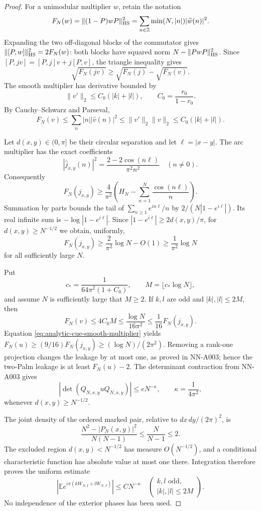 \begin{proof}
For a unimodular multiplier $w$, retain the notation
\[
 F_N(w)=\|(1-P)wP\|_{\rm HS}^2
       =\sum_{n\in\mathbb Z}\min(N,|n|)|\widehat w(n)|^2.
\]
Expanding the two off-diagonal blocks of the commutator gives
$\|[P,w]\|_{\rm HS}^2=2F_N(w)$: both blocks have squared norm
$N-\|PwP\|_{\rm HS}^2$. Since
$[P,jv]=[P,j]v+j[P,v]$, the triangle inequality gives
\begin{equation}\label{eq:analytic-cue-smooth-multiplier}
       \sqrt{F_N(jv)}\ge\sqrt{F_N(j)}-\sqrt{F_N(v)}.
\end{equation}
The smooth multiplier has derivative bounded by
\[
 \|v'\|_2\le C_0(|k|+|l|),\qquad C_0=\frac{r_0}{1-r_0}.
\]
By Cauchy--Schwarz and Parseval,
\begin{equation}\label{eq:analytic-cue-smooth-leakage}
 F_N(v)\le\sum_n|n||\widehat v(n)|^2
     \le\|v'\|_2\|v\|_2
     \le C_0(|k|+|l|).
\end{equation}

Let $d(x,y)\in(0,\pi]$ be their circular separation and let
$\ell=|x-y|$. The arc multiplier has the exact coefficients
\[
 |\widehat j_{x,y}(n)|^2
       =\frac{2-2\cos(n\ell)}{\pi^2n^2}\quad(n\ne0).
\]
Consequently
\[
 F_N(j_{x,y})\ge\frac4{\pi^2}
       \left(H_N-\sum_{n=1}^N\frac{\cos(n\ell)}n\right).
\]
Summation by parts bounds the tail of
$\sum_{n\ge1}e^{in\ell}/n$ by
$2/(N|1-e^{i\ell}|)$. Its real infinite sum is
$-\log|1-e^{i\ell}|$. Since
$|1-e^{i\ell}|\ge2d(x,y)/\pi$, for
$d(x,y)\ge N^{-1/2}$ we obtain, uniformly,
\[
 F_N(j_{x,y})\ge\frac2{\pi^2}\log N-O(1)
                         \ge\frac1{\pi^2}\log N
\]
for all sufficiently large $N$.

Put
\[
 c_* =\frac1{64\pi^2(1+C_0)},\qquad
 M=\lfloor c_*\log N\rfloor,
\]
and assume $N$ is sufficiently large that $M\ge2$. If $k,l$ are
odd and $|k|,|l|\le2M$, then
\[
 F_N(v)\le4C_0M\le\frac{\log N}{16\pi^2}
                         \le\frac1{16}F_N(j_{x,y}).
\]
Equation \eqref{eq:analytic-cue-smooth-multiplier} yields
$F_N(u)\ge(9/16)F_N(j_{x,y})\ge(\log N)/(2\pi^2)$.
Removing a rank-one projection changes the leakage by at most
one, as proved in NN-A003; hence the two-Palm leakage is at
least $F_N(u)-2$. The determinant contraction from NN-A003 gives
\[
 |\det(Q_{N,x,y}uQ_{N,x,y})|
                 \le eN^{-\kappa},\qquad
                      \kappa=\frac1{4\pi^2},
\]
whenever $d(x,y)\ge N^{-1/2}$.

The joint density of the ordered marked pair, relative to
$dx\,dy/(2\pi)^2$, is
\[
 \frac{N^2-|P_N(x,y)|^2}{N(N-1)}\le\frac{N}{N-1}\le2.
\]
The excluded region $d(x,y)<N^{-1/2}$ has measure
$O(N^{-1/2})$, and a conditional characteristic function has
absolute value at most one there. Integration therefore proves
the uniform estimate
\begin{equation}\label{eq:analytic-cue-uniform-odd-pair}
 \left|\mathbb E e^{i\pi(kW_{N,I}+lW_{N,J})}\right|
                  \le C N^{-\kappa}
 \quad\left(\begin{array}{c}k,l\text{ odd},\\|k|,|l|\le2M\end{array}\right).
\end{equation}
No independence of the exterior phases has been used.


\end{proof}
